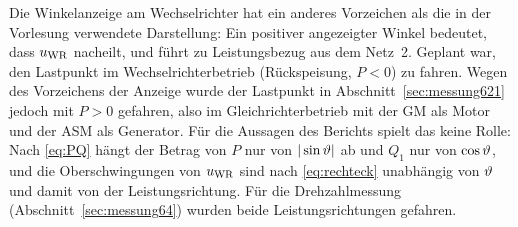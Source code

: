 Die Winkelanzeige am Wechselrichter hat ein anderes Vorzeichen als die in der Vorlesung verwendete Darstellung: Ein positiver angezeigter Winkel bedeutet, dass $u_{\mathrm{WR}}$ nacheilt, und führt zu Leistungsbezug aus dem Netz~2. Geplant war, den Lastpunkt im Wechselrichterbetrieb (Rückspeisung, $P<0$) zu fahren. Wegen des Vorzeichens der Anzeige wurde der Lastpunkt in Abschnitt~\ref{sec:messung621} jedoch mit $P>0$ gefahren, also im Gleichrichterbetrieb mit der GM als Motor und der ASM als Generator. Für die Aussagen des Berichts spielt das keine Rolle: Nach \eqref{eq:PQ} hängt der Betrag von $P$ nur von $|\sin\vartheta|$ ab und $Q_1$ nur von $\cos\vartheta$, und die Oberschwingungen von $u_{\mathrm{WR}}$ sind nach \eqref{eq:rechteck} unabhängig von $\vartheta$ und damit von der Leistungsrichtung. Für die Drehzahlmessung (Abschnitt~\ref{sec:messung64}) wurden beide Leistungsrichtungen gefahren.
